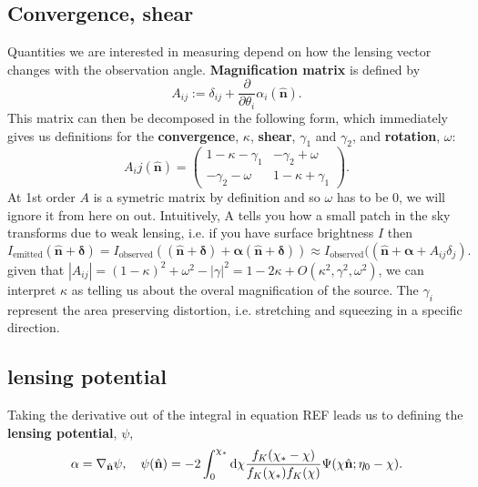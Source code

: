 \documentclass[11pt]{article} %
\DeclareRobustCommand{\d}{\ifmmode\text{d}\else d\fi}
\begin{document}
\subsection{Convergence, shear}
Quantities we are interested in measuring depend on how the lensing vector changes with the observation angle. \textbf{Magnification matrix} is defined by
\begin{equation}
    A_{ij} := \delta_{ij} + \frac{\partial}{\partial\theta_i}\alpha_i(\hat{\mathbf n}).
\end{equation}
This matrix can then be decomposed in the following form, which immediately gives us definitions for the \textbf{convergence}, $\kappa$, \textbf{shear}, $\gamma_1$ and $\gamma_2$, and \textbf{rotation}, $\omega$:
\begin{equation}
    A_ij(\hat{\mathbf n}) = \begin{pmatrix}
        1 - \kappa - \gamma_1 & -\gamma_2 + \omega \\
        -\gamma_2 - \omega & 1 - \kappa + \gamma_1
    \end{pmatrix}.
\end{equation}
At 1st order $A$ is a symetric matrix by definition and so $\omega$ has to be 0, we will ignore it from here on out. Intuitively, A tells you how a small patch in the sky transforms due to weak lensing, i.e. if you have surface brightness $I$ then
\begin{equation}
    I_{\text{emitted}}(\hat{\mathbf{n}} + \mathbf{\delta}) = I_{\text{observed}}((\hat{\mathbf{n}} + \mathbf{\delta}) + \mathbf\alpha(\hat{\mathbf{n}} + \mathbf{\delta})) \approx I_{\text{observed}}((\hat{\mathbf{n}} + \mathbf{\alpha} + A_{ij}\delta_{j}).
\end{equation}
given that $|A_{ij}| = (1 - \kappa)^2 + \omega^2 - |\gamma|^2 = 1 - 2\kappa + O(\kappa^2, \gamma^2, \omega^2)$, we can interpret $\kappa$ as telling us about the overal magnification of the source. The $\gamma_i$ represent the area preserving distortion, i.e. stretching and squeezing in a specific direction.

\subsection{lensing potential}
Taking the derivative out of the integral in equation REF leads us to defining the \textbf{lensing potential}, $\psi$,
\begin{equation}
    \mathbf \alpha = \nabla_{\hat{\mathbf n}}\psi, \quad \psi(\hat{\mathbf n}) = -2 \int_0^{\chi_*} \d \chi \frac{f_K(\chi_* - \chi)}{f_K(\chi_*)f_K(\chi)}\Psi(\chi\hat{\mathbf n}; \eta_0 - \chi).
\end{equation}
\end{document}
